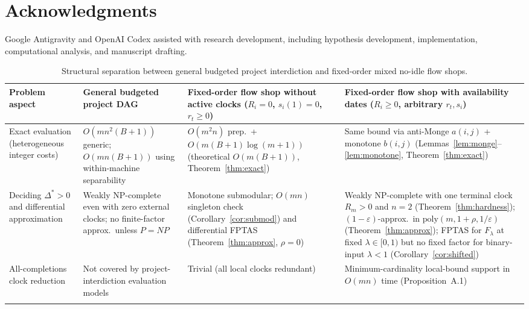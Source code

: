 \documentclass[11pt,letterpaper]{article}
\begin{document}
\section*{Acknowledgments}

Google Antigravity and OpenAI Codex assisted with research development, including hypothesis development, implementation, computational analysis, and manuscript drafting.

\clearpage



\clearpage
\begin{table}[!ht]
\centering
\footnotesize
\caption{Structural separation between general budgeted project interdiction and fixed-order mixed no-idle flow shops.}
\label{tab:separation}
\begin{tabularx}{\textwidth}{>{\raggedright\arraybackslash}p{2.6cm}>{\raggedright\arraybackslash}X>{\raggedright\arraybackslash}X>{\raggedright\arraybackslash}X}
\toprule
Problem aspect & General budgeted project DAG \citep{Brown2005,Wu2026} & Fixed-order flow shop without active clocks ($R_i=0$, $s_i(1)=0$, $r_t\ge 0$) & Fixed-order flow shop with availability dates ($R_i\ge 0$, arbitrary $r_t, s_i$) \\
\midrule
Exact evaluation (heterogeneous integer costs) & $O(mn^2(B+1))$ generic; $O(mn(B+1))$ using within-machine separability & $O(m^2n)$ prep.\ + $O(m(B+1)\log(m+1))$ (theoretical $O(m(B+1))$, Theorem~\ref{thm:exact}) & Same bound via anti-Monge $a(i,j)$ + monotone $b(i,j)$ (Lemmas~\ref{lem:monge}--\ref{lem:monotone}, Theorem~\ref{thm:exact}) \\
\addlinespace[4pt]
Deciding $\Delta^*>0$ and differential approximation & Weakly NP-complete even with zero external clocks; no finite-factor approx.\ unless $P=NP$ & Monotone submodular; $O(mn)$ singleton check (Corollary~\ref{cor:submod}) and differential FPTAS (Theorem~\ref{thm:approx}, $\rho=0$) & Weakly NP-complete with one terminal clock $R_m>0$ and $n=2$ (Theorem~\ref{thm:hardness}); $(1-\varepsilon)$-approx.\ in $\mathrm{poly}(m, 1+\rho, 1/\varepsilon)$ (Theorem~\ref{thm:approx}); FPTAS for $F_\lambda$ at fixed $\lambda\in[0,1)$ but no fixed factor for binary-input $\lambda<1$ (Corollary~\ref{cor:shifted}) \\
\addlinespace[4pt]
All-completions clock reduction & Not covered by project-interdiction evaluation models & Trivial (all local clocks redundant) & Minimum-cardinality local-bound support in $O(mn)$ time (Proposition~A.1) \\
\addlinespace[4pt]

\end{tabularx}
\end{table}
\end{document}

